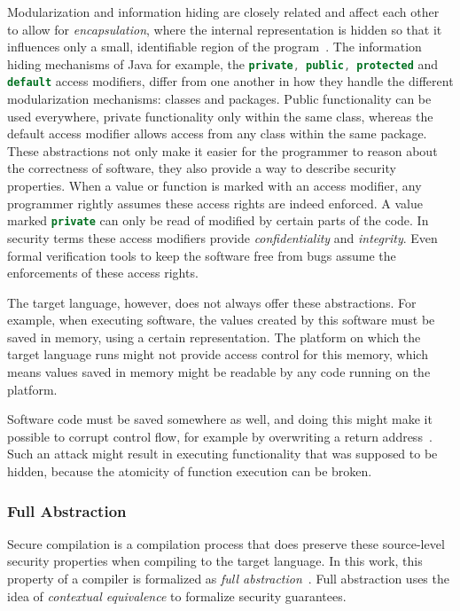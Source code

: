 Modularization and information hiding are closely related and affect each other to allow for \emph{encapsulation}, where the internal representation is hidden so that it influences only a small, identifiable region of the program~\cite{Pierce}.
The information hiding mechanisms of Java for example, the \lstinline[language=Java]{private, public, protected} and \lstinline[language=Java]{default} access modifiers, differ from one another in how they handle the different modularization mechanisms: classes and packages.
Public functionality can be used everywhere, private functionality only within the same class, whereas the default access modifier allows access from any class within the same package.
\\[1em]
These abstractions not only make it easier for the programmer to reason about the correctness of software, they also provide a way to describe security properties.
When a value or function is marked with an access modifier, any programmer rightly assumes these access rights are indeed enforced.
A value marked \lstinline[language=Java]{private} can only be read of modified by certain parts of the code.
In security terms these access modifiers provide \emph{confidentiality} and \emph{integrity}.
Even formal verification tools to keep the software free from bugs assume the enforcements of these access rights.

The target language, however, does not always offer these abstractions.
For example, when executing software, the values created by this software must be saved in memory, using a certain representation.
The platform on which the target language runs might not provide access control for this memory, which means values saved in memory might be readable by any code running on the platform.

Software code must be saved somewhere as well, and doing this might make it possible to corrupt control flow, for example by overwriting a return address~\cite{OVSPaper}.
Such an attack might result in executing functionality that was supposed to be hidden, because the atomicity of function execution can be broken.

\subsubsection{Full Abstraction}
\label{sec:fullabstraction}
Secure compilation is a compilation process that does preserve these source-level security properties when compiling to the target language.
In this work, this property of a compiler is formalized as \emph{full abstraction}~\cite{Abadi}.
Full abstraction uses the idea of \emph{contextual equivalence} to formalize security guarantees.


